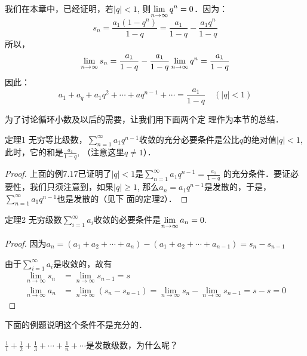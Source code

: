 \begin{solution}
    我们在本章中，已经证明，若$|q|<1$, 则$\displaystyle\lim_{n\to\infty}q^n=0$．因为：
\[s_n=\frac{a_1(1-q^n)}{1-q}=\frac{a_1}{1-q}-\frac{a_1q^n}{1-q}\]
所以，
\[\displaystyle\lim_{n\to\infty}s_n=\dfrac{a_1}{1-q}-\dfrac{a_1}{1-q}\displaystyle\lim_{n\to\infty}q^n=\dfrac{a_1}{1-q}\]
因此：\[a_1+a_q+a_1q^2+\cdots +aq^{n-1}+\cdots=\frac{a_1}{1-q} \quad (|q|<1)\]
\end{solution}

为了讨论循环小数及以后的需要，让我们用下面两个定
理作为本节的总结．

\begin{blk}{定理1}
    无穷等比级数，$\sum^{\infty}_{n=1}a_1q^{n-1}$收敛的充分必要条件是公比$q$的绝对值$|q|<1$, 此时，它的和是$\frac{a_1}{1-q}$, （注意这里$q\ne 1$）．
\end{blk}

\begin{proof}
    上面的例7.17已证明了$|q|<1$是$\sum^{\infty}_{n=1}a_1q^{n-1}=\frac{a_1}{1-q}$
的充分条件．要证必要性，我们只须注意到，如果$|q|\ge 1$, 
那么$a_n=a_1q^{n-1}$是发散的，于是，$\sum^{\infty}_{n=1}a_1q^{n-1}$也是发散的（见下
面的定理2）．
\end{proof}

\begin{blk}{定理2}
无穷级数$\sum^{\infty}_{i=1}a_i$收敛的必要条件是$\displaystyle\lim_{n\to \infty}a_n=0$.
\end{blk}

\begin{proof}
因为$a_n=(a_1+a_2+\cdots +a_n)-(a_1+a_2+\cdots +a_{n-1})
=s_n-s_{n-1}$

由于$\sum^{\infty}_{i=1}a_i$是收敛的，故有
\[\begin{split}
    \lim_{n\to\infty}s_n&=\lim_{n\to\infty}s_{n-1}=s\\
    \lim_{n\to\infty}a_n&=\lim_{n\to\infty}(s_n-s_{n-1})=\lim_{n\to\infty}s_n-\lim_{n\to\infty}s_{n-1}=s-s=0
\end{split}\]
\end{proof}

下面的例题说明这个条件不是充分的．


\begin{example}
    $\frac{1}{1}+\frac{1}{2}+\frac{1}{3}+\cdots +\frac{1}{n}+\cdots$是发散级数，为什么呢？
\end{example}


